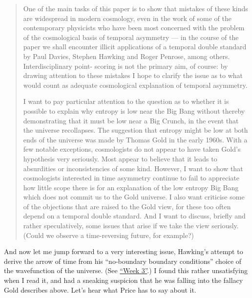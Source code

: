 \documentclass[12pt]{article}
\begin{document}
\begin{quote}
One of the main tasks of this paper is to show that mistakes of these
kinds are widespread in modern cosmology, even in the work of some of
the contemporary physicists who have been most concerned with the
problem of the cosmological basis of temporal asymmetry --- in the
course of the paper we shall encounter illicit applications of a
temporal double standard by Paul Davies, Stephen Hawking and Roger
Penrose, among others. Interdisciplinary point- scoring is not the
primary aim, of course: by drawing attention to these mistakes I hope to
clarify the issue as to what would count as adequate cosmological
explanation of temporal asymmetry.

I want to pay particular attention to the question as to whether it is
possible to explain why entropy is low near the Big Bang without thereby
demonstrating that it must be low near a Big Crunch, in the event that
the universe recollapses. The suggestion that entropy might be low at
both ends of the universe was made by Thomas Gold in the early 1960s.
With a few notable exceptions, cosmologists do not appear to have taken
Gold's hypothesis very seriously. Most appear to believe that it leads
to absurdities or inconsistencies of some kind. However, I want to show
that cosmologists interested in time asymmetry continue to fail to
appreciate how little scope there is for an explanation of the low
entropy Big Bang which does not commit us to the Gold universe. I also
want criticise some of the objections that are raised to the Gold view,
for these too often depend on a temporal double standard. And I want to
discuss, briefly and rather speculatively, some issues that arise if we
take the view seriously. (Could we observe a time-reversing future, for
example?)
\end{quote}

And now let me jump forward to a very interesting issue, Hawking's
attempt to derive the arrow of time from his ``no-boundary boundary
conditions'' choice of the wavefunction of the universe. (See
\protect\hyperlink{week3}{``Week 3''}.) I found this rather unsatisfying
when I read it, and had a sneaking suspicion that he was falling into
the fallacy Gold describes above. Let's hear what Price has to say about
it.
\end{document}
